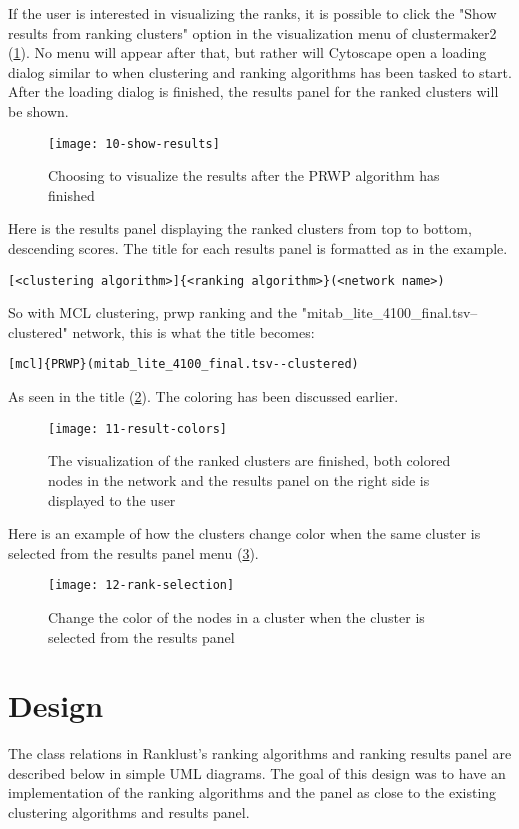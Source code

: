 If the user is interested in visualizing the ranks, it is possible to click the
"Show results from ranking clusters" option in the visualization menu of
clustermaker2 (\ref{fig:show-results}). No menu will appear after that, but
rather will Cytoscape open a loading dialog similar to when clustering and
ranking algorithms has been tasked to start. After the loading dialog is
finished, the results panel for the ranked clusters will be shown.
\begin{figure}[H]
    \texttt{[image: 10-show-results]}
    \caption{Choosing to visualize the results after the PRWP algorithm has
    finished}
    \label{fig:show-results}
\end{figure}

Here is the results panel displaying the ranked clusters from top to bottom,
descending scores. The title for each results panel is formatted as in the
example.
\begin{Verbatim}[fontsize=\scriptsize]
[<clustering algorithm>]{<ranking algorithm>}(<network name>)
\end{Verbatim}
So with MCL clustering, \gls{prwp} ranking and the
"mitab\_lite\_4100\_final.tsv--clustered" network, this is what the title
becomes:
\begin{Verbatim}[fontsize=\scriptsize]
[mcl]{PRWP}(mitab_lite_4100_final.tsv--clustered)
\end{Verbatim}
As seen in the title (\ref{fig:result-colors}). The coloring has been discussed
earlier.
\begin{figure}[H]
    \texttt{[image: 11-result-colors]}
    \caption{The visualization of the ranked clusters are finished, both colored
        nodes in the network and the results panel on the right side is
    displayed to the user}
    \label{fig:result-colors}
\end{figure}

Here is an example of how the clusters change color when the same cluster is
selected from the results panel menu (\ref{fig:rank-selection}).
\begin{figure}[H]
    \texttt{[image: 12-rank-selection]}
    \caption{Change the color of the nodes in a cluster when the cluster is
    selected from the results panel}
    \label{fig:rank-selection}
\end{figure}

\section{Design}
The class relations in Ranklust's ranking algorithms and ranking results panel
are described below in simple UML diagrams. The goal of this design was to have
an implementation of the ranking algorithms and the panel as close to the
existing clustering algorithms and results panel. 

